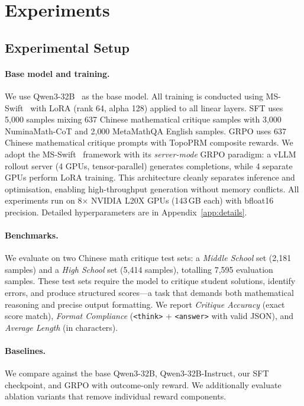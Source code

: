 \section{Experiments}
\label{sec:experiments}

\subsection{Experimental Setup}
\label{sec:setup}

\paragraph{Base model and training.}
We use Qwen3-32B~\citep{qwen3} as the base model. All training is
conducted using MS-Swift~\citep{msswift} with LoRA (rank 64, alpha 128)
applied to all linear layers. SFT uses 5{,}000 samples mixing 637
Chinese mathematical critique samples with 3{,}000 NuminaMath-CoT and
2{,}000 MetaMathQA English samples. GRPO uses 637 Chinese mathematical
critique prompts with TopoPRM composite rewards. We adopt the
MS-Swift~\citep{msswift} framework with its \emph{server-mode} GRPO
paradigm: a vLLM rollout server (4 GPUs, tensor-parallel) generates
completions, while 4 separate GPUs perform LoRA training. This
architecture cleanly separates inference and optimisation, enabling
high-throughput generation without memory conflicts. All experiments run
on 8$\times$ NVIDIA L20X GPUs (143\,GB each) with bfloat16 precision.
Detailed hyperparameters are in Appendix~\ref{app:details}.

\paragraph{Benchmarks.}
We evaluate on two Chinese math critique test sets: a \emph{Middle School}
set (2{,}181 samples) and a \emph{High School} set (5{,}414 samples),
totalling 7{,}595 evaluation samples. These test sets require the model
to critique student solutions, identify errors, and produce structured
scores---a task that demands both mathematical reasoning and precise
output formatting. We report \emph{Critique Accuracy} (exact score
match), \emph{Format Compliance} (\texttt{<think>} +
\texttt{<answer>} with valid JSON), and \emph{Average Length}
(in characters).

\paragraph{Baselines.}
We compare against the base Qwen3-32B, Qwen3-32B-Instruct, our SFT
checkpoint, and GRPO with outcome-only reward. We additionally evaluate
ablation variants that remove individual reward components.

